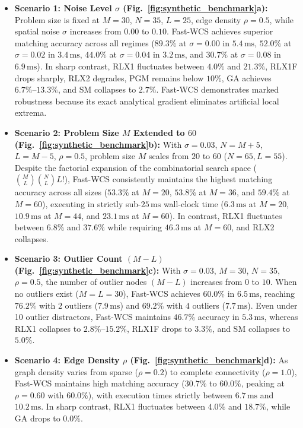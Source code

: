 \documentclass[conference]{IEEEtran}
\begin{document}
\begin{itemize}
    \item \textbf{Scenario 1: Noise Level $\sigma$ (Fig.~\ref{fig:synthetic_benchmark}a):} Problem size is fixed at $M = 30$, $N = 35$, $L = 25$, edge density $\rho = 0.5$, while spatial noise $\sigma$ increases from $0.00$ to $0.10$. Fast-WCS achieves superior matching accuracy across all regimes ($89.3\%$ at $\sigma = 0.00$ in $5.4\,\text{ms}$, $52.0\%$ at $\sigma = 0.02$ in $3.4\,\text{ms}$, $44.0\%$ at $\sigma = 0.04$ in $3.2\,\text{ms}$, and $30.7\%$ at $\sigma = 0.08$ in $6.9\,\text{ms}$). In sharp contrast, RLX1 fluctuates between $4.0\%$ and $21.3\%$, RLX1F drops sharply, RLX2 degrades, PGM remains below $10\%$, GA achieves $6.7\%\text{--}13.3\%$, and SM collapses to $2.7\%$. Fast-WCS demonstrates marked robustness because its exact analytical gradient eliminates artificial local extrema.
    \item \textbf{Scenario 2: Problem Size $M$ Extended to $60$ (Fig.~\ref{fig:synthetic_benchmark}b):} With $\sigma = 0.03$, $N = M + 5$, $L = M - 5$, $\rho = 0.5$, problem size $M$ scales from $20$ to $60$ ($N=65, L=55$). Despite the factorial expansion of the combinatorial search space ($\binom{M}{L}\binom{N}{L}L!$), Fast-WCS consistently maintains the highest matching accuracy across all sizes ($53.3\%$ at $M=20$, $53.8\%$ at $M=36$, and $59.4\%$ at $M=60$), executing in strictly sub-$25\,\text{ms}$ wall-clock time ($6.3\,\text{ms}$ at $M=20$, $10.9\,\text{ms}$ at $M=44$, and $23.1\,\text{ms}$ at $M=60$). In contrast, RLX1 fluctuates between $6.8\%$ and $37.6\%$ while requiring $46.3\,\text{ms}$ at $M=60$, and RLX2 collapses.
    \item \textbf{Scenario 3: Outlier Count $(M - L)$ (Fig.~\ref{fig:synthetic_benchmark}c):} With $\sigma = 0.03$, $M = 30$, $N = 35$, $\rho = 0.5$, the number of outlier nodes $(M - L)$ increases from $0$ to $10$. When no outliers exist ($M = L = 30$), Fast-WCS achieves $60.0\%$ in $6.5\,\text{ms}$, reaching $76.2\%$ with $2$ outliers ($7.9\,\text{ms}$) and $69.2\%$ with $4$ outliers ($7.7\,\text{ms}$). Even under 10 outlier distractors, Fast-WCS maintains $46.7\%$ accuracy in $5.3\,\text{ms}$, whereas RLX1 collapses to $2.8\%\text{--}15.2\%$, RLX1F drops to $3.3\%$, and SM collapses to $5.0\%$.
    \item \textbf{Scenario 4: Edge Density $\rho$ (Fig.~\ref{fig:synthetic_benchmark}d):} As graph density varies from sparse ($\rho = 0.2$) to complete connectivity ($\rho = 1.0$), Fast-WCS maintains high matching accuracy ($30.7\%$ to $60.0\%$, peaking at $\rho = 0.60$ with $60.0\%$), with execution times strictly between $6.7\,\text{ms}$ and $10.2\,\text{ms}$. In sharp contrast, RLX1 fluctuates between $4.0\%$ and $18.7\%$, while GA drops to $0.0\%$.
\end{itemize}
\end{document}
